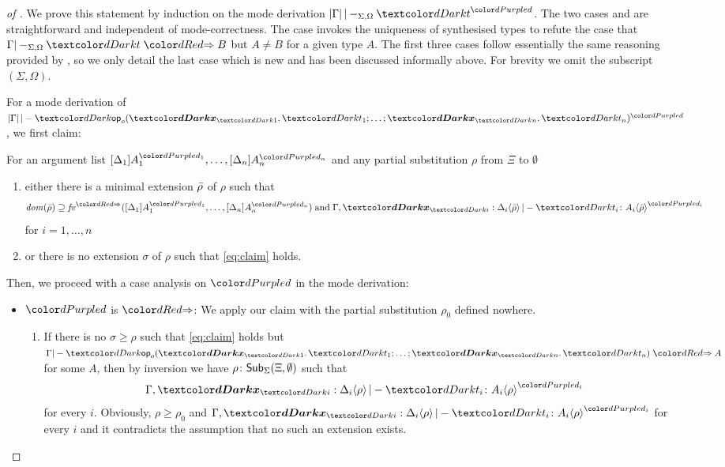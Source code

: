 \begin{proof}[of {}]
  We prove this statement by induction on the mode derivation\/ $\erase{\Gamma} |-_{\Sigma, \Omega} \isTerm{t}^{\dir{d}}$.
  The two cases  and  are straightforward and independent of mode-correctness.
  The case  invokes the uniqueness of synthesised types to refute the case that $\Gamma |-_{\Sigma, \Omega} \isTerm{t} \syn B$ but $A \neq B$ for a given type $A$.
  The first three cases follow essentially the same reasoning provided by \citet{Wadler2022}, so we only detail the last case  which is new and has been discussed informally above.
  For brevity we omit the subscript $(\Sigma, \Omega)$.

      For a mode derivation of $\erase{\Gamma} |- \tmOpts^{\dir{d}}$, we first claim:
      \begin{claim}\label{lem:args-induction}
        For an argument list $\biargs$ and any partial substitution $\rho$ from $\Xi$ to $\emptyset$
        \begin{enumerate}
          \item either there is a minimal extension $\bar{\rho}$ of $\rho$ such that 
            \begin{equation} \label{eq:claim}
              \dom(\ext{\rho}) \supseteq \synvar(\biargs)
              \;\text{and}\;
              \Gamma, \vars{x}_\isTerm{i} : \simsub{\Delta_i}{\ext{\rho}} |- \isTerm{t_i} \colon \simsub{A_i}{\ext{\rho}}^{\dir{d_i}}
            \end{equation}
            for $i = 1, \ldots, n$
          \item or there is no extension $\sigma$ of $\rho$ such that \eqref{eq:claim} holds.
        \end{enumerate}
      \end{claim}

      Then, we proceed with a case analysis on $\dir{d}$ in the mode derivation:
      \begin{itemize}
        \item $\dir{d}$ is $\syn$: We apply our claim with the partial substitution $\rho_0$ defined nowhere.
          \begin{enumerate}
            \item If there is no $\sigma \geq \rho$ such that \eqref{eq:claim} holds but $\Gamma |- \tmOpts \syn A$ for some $A$, then by inversion we have $\rho\colon \mathsf{Sub}_{\Sigma}(\Xi,\emptyset)$ such that
              \[
                \Gamma, \vars{x}_\isTerm{i} : \simsub{\Delta_i}{\rho} |- \isTerm{t_i} \colon \simsub{A_i}{\rho}^{\dir{d_i}}
              \]
              for every $i$.
              Obviously, $\rho \geq \rho_0$ and ${\Gamma, \vars{x}_\isTerm{i} : \simsub{\Delta_i}{\rho} |- \isTerm{t_i} \colon \simsub{A_i}{\rho}^{\dir{d_i}}}$ for every $i$ and it contradicts the assumption that no such an extension exists.


\end{enumerate}
\end{itemize}
\end{proof}
